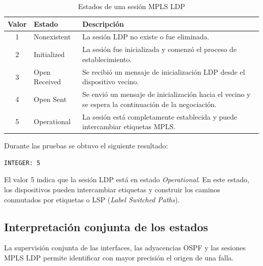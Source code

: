 \begin{table}[H]
\centering
\caption{Estados de una sesión MPLS LDP}
\label{tab:estados-ldp}
\begin{tabular}{c|l|p{8cm}}
\hline
\textbf{Valor} & \textbf{Estado} & \textbf{Descripción} \\ \hline

1 & Nonexistent &
La sesión LDP no existe o fue eliminada. \\ \hline

2 & Initialized &
La sesión fue inicializada y comenzó el proceso de establecimiento. \\ \hline

3 & Open Received &
Se recibió un mensaje de inicialización LDP desde el dispositivo vecino. \\ \hline

4 & Open Sent &
Se envió un mensaje de inicialización hacia el vecino y se espera la continuación de la negociación. \\ \hline

5 & Operational &
La sesión está completamente establecida y puede intercambiar etiquetas MPLS. \\ \hline

\end{tabular}
\end{table}

Durante las pruebas se obtuvo el siguiente resultado:

\begin{lstlisting}[style=terminal]
INTEGER: 5
\end{lstlisting}

El valor 5 indica que la sesión LDP está en estado \textit{Operational}. En este estado, los dispositivos pueden intercambiar etiquetas y construir los caminos conmutados por etiquetas o LSP (\textit{Label Switched Paths}).

\subsection{Interpretación conjunta de los estados}

La supervisión conjunta de las interfaces, las adyacencias OSPF y las sesiones MPLS LDP permite identificar con mayor precisión el origen de una falla.

